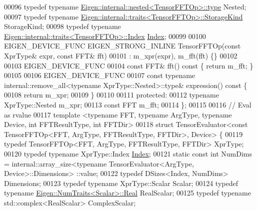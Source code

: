 \begin{DoxyCode}
00096   \textcolor{keyword}{typedef} \textcolor{keyword}{typename} \hyperlink{class_eigen_1_1internal_1_1_tensor_lazy_evaluator_writable}{Eigen::internal::nested<TensorFFTOp>::type} 
      Nested;
00097   \textcolor{keyword}{typedef} \textcolor{keyword}{typename} \hyperlink{struct_eigen_1_1internal_1_1traits}{Eigen::internal::traits<TensorFFTOp>::StorageKind}
       StorageKind;
00098   \textcolor{keyword}{typedef} \textcolor{keyword}{typename} \hyperlink{struct_eigen_1_1internal_1_1traits}{Eigen::internal::traits<TensorFFTOp>::Index} 
      \hyperlink{namespace_eigen_a62e77e0933482dafde8fe197d9a2cfde}{Index};
00099 
00100   EIGEN\_DEVICE\_FUNC EIGEN\_STRONG\_INLINE TensorFFTOp(\textcolor{keyword}{const} XprType& expr, \textcolor{keyword}{const} FFT& fft)
00101       : m\_xpr(expr), m\_fft(fft) \{\}
00102 
00103   EIGEN\_DEVICE\_FUNC
00104   \textcolor{keyword}{const} FFT& fft()\textcolor{keyword}{ const }\{ \textcolor{keywordflow}{return} m\_fft; \}
00105 
00106   EIGEN\_DEVICE\_FUNC
00107   \textcolor{keyword}{const} \textcolor{keyword}{typename} internal::remove\_all<typename XprType::Nested>::type& expression()\textcolor{keyword}{ const }\{
00108     \textcolor{keywordflow}{return} m\_xpr;
00109   \}
00110 
00111  \textcolor{keyword}{protected}:
00112   \textcolor{keyword}{typename} XprType::Nested m\_xpr;
00113   \textcolor{keyword}{const} FFT m\_fft;
00114 \};
00115 
00116 \textcolor{comment}{// Eval as rvalue}
00117 \textcolor{keyword}{template} <\textcolor{keyword}{typename} FFT, \textcolor{keyword}{typename} ArgType, \textcolor{keyword}{typename} Device, \textcolor{keywordtype}{int} FFTResultType, \textcolor{keywordtype}{int} FFTDir>
00118 \textcolor{keyword}{struct }TensorEvaluator<const TensorFFTOp<FFT, ArgType, FFTResultType, FFTDir>, Device> \{
00119   \textcolor{keyword}{typedef} TensorFFTOp<FFT, ArgType, FFTResultType, FFTDir> XprType;
00120   \textcolor{keyword}{typedef} \textcolor{keyword}{typename} XprType::Index \hyperlink{namespace_eigen_a62e77e0933482dafde8fe197d9a2cfde}{Index};
00121   \textcolor{keyword}{static} \textcolor{keyword}{const} \textcolor{keywordtype}{int} NumDims = internal::array\_size<typename TensorEvaluator<ArgType, Device>::Dimensions>
      ::value;
00122   \textcolor{keyword}{typedef} DSizes<Index, NumDims> Dimensions;
00123   \textcolor{keyword}{typedef} \textcolor{keyword}{typename} XprType::Scalar Scalar;
00124   \textcolor{keyword}{typedef} \textcolor{keyword}{typename} \hyperlink{group___sparse_core___module}{Eigen::NumTraits<Scalar>::Real} RealScalar;
00125   \textcolor{keyword}{typedef} \textcolor{keyword}{typename} std::complex<RealScalar> ComplexScalar;

\end{DoxyCode}
